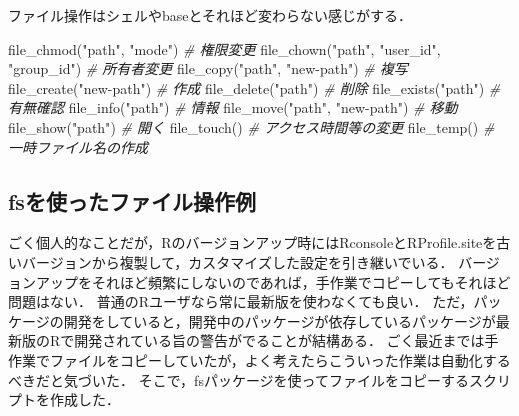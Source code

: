 \documentclass[
]{article}
\newenvironment{Shaded}{\begin{snugshade}}{\end{snugshade}}
\newcommand{\CommentTok}[1]{\textcolor[rgb]{0.56,0.35,0.01}{\textit{#1}}}
\newcommand{\FunctionTok}[1]{\textcolor[rgb]{0.00,0.00,0.00}{#1}}
\newcommand{\NormalTok}[1]{#1}
\newcommand{\StringTok}[1]{\textcolor[rgb]{0.31,0.60,0.02}{#1}}
\begin{document}
ファイル操作はシェルやbaseとそれほど変わらない感じがする．

\begin{Shaded}
\begin{Highlighting}[]
\FunctionTok{file\_chmod}\NormalTok{(}\StringTok{"path"}\NormalTok{, }\StringTok{"mode"}\NormalTok{)                }\CommentTok{\# 権限変更   }
\FunctionTok{file\_chown}\NormalTok{(}\StringTok{"path"}\NormalTok{, }\StringTok{"user\_id"}\NormalTok{, }\StringTok{"group\_id"}\NormalTok{) }\CommentTok{\# 所有者変更   }
\FunctionTok{file\_copy}\NormalTok{(}\StringTok{"path"}\NormalTok{, }\StringTok{"new{-}path"}\NormalTok{)             }\CommentTok{\# 複写   }
\FunctionTok{file\_create}\NormalTok{(}\StringTok{"new{-}path"}\NormalTok{)                   }\CommentTok{\# 作成   }
\FunctionTok{file\_delete}\NormalTok{(}\StringTok{"path"}\NormalTok{)                       }\CommentTok{\# 削除   }
\FunctionTok{file\_exists}\NormalTok{(}\StringTok{"path"}\NormalTok{)                       }\CommentTok{\# 有無確認   }
\FunctionTok{file\_info}\NormalTok{(}\StringTok{"path"}\NormalTok{)                         }\CommentTok{\# 情報   }
\FunctionTok{file\_move}\NormalTok{(}\StringTok{"path"}\NormalTok{, }\StringTok{"new{-}path"}\NormalTok{)             }\CommentTok{\# 移動   }
\FunctionTok{file\_show}\NormalTok{(}\StringTok{"path"}\NormalTok{)                         }\CommentTok{\# 開く   }
\FunctionTok{file\_touch}\NormalTok{()                              }\CommentTok{\# アクセス時間等の変更   }
\FunctionTok{file\_temp}\NormalTok{()                               }\CommentTok{\# 一時ファイル名の作成   }
\end{Highlighting}
\end{Shaded}

\hypertarget{fsux3092ux4f7fux3063ux305fux30d5ux30a1ux30a4ux30ebux64cdux4f5cux4f8b}{%
\subsection{fsを使ったファイル操作例}\label{fsux3092ux4f7fux3063ux305fux30d5ux30a1ux30a4ux30ebux64cdux4f5cux4f8b}}

ごく個人的なことだが，Rのバージョンアップ時にはRconsoleとRProfile.siteを古いバージョンから複製して，カスタマイズした設定を引き継いでいる．
バージョンアップをそれほど頻繁にしないのであれば，手作業でコピーしてもそれほど問題はない．
普通のRユーザなら常に最新版を使わなくても良い．
ただ，パッケージの開発をしていると，開発中のパッケージが依存しているパッケージが最新版のRで開発されている旨の警告がでることが結構ある．
ごく最近までは手作業でファイルをコピーしていたが，よく考えたらこういった作業は自動化するべきだと気づいた．
そこで，fsパッケージを使ってファイルをコピーするスクリプトを作成した．
\end{document}
